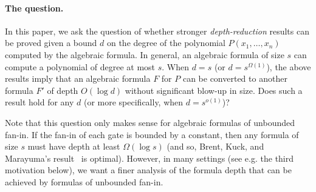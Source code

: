 \documentclass[11pt,a4paper]{article}
\begin{document}
\paragraph{The question.} In this paper, we ask the question of whether stronger \emph{depth-reduction} results can be proved given a bound $d$ on the degree of the polynomial $P(x_1,\ldots,x_n)$ computed by the algebraic formula. In general, an algebraic formula of size $s$ can compute a polynomial of degree at most $s$. When $d = s$ (or $d = s^{\Omega(1)}$), the above results imply that an algebraic formula $F$ for $P$ can be converted to another formula $F'$ of depth $O(\log d)$ without significant blow-up in size. Does such a result hold for any $d$ (or more specifically, when $d = s^{o(1)}$)?

Note that this question only makes sense for algebraic formulas of unbounded fan-in. If the fan-in of each gate is bounded by a constant, then any formula of size $s$ must have depth at least $\Omega(\log s)$ (and so, Brent, Kuck, and Marayuma's result~\cite{BKM} is optimal). However, in many settings (see e.g. the third motivation below), we want a finer analysis of the formula depth that can be achieved by formulas of unbounded fan-in. 
\end{document}
